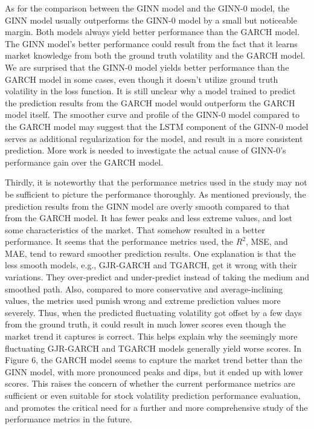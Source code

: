 As for the comparison between the GINN model and the GINN-0 model, the GINN model usually outperforms the GINN-0 model by a small but noticeable margin. Both models always yield better performance than the GARCH model. The GINN model's better performance could result from the fact that it learns market knowledge from both the ground truth volatility and the GARCH model. We are surprised that the GINN-0 model yields better performance than the GARCH model in some cases, even though it doesn't utilize ground truth volatility in the loss function. It is still unclear why a model trained to predict the prediction results from the GARCH model would outperform the GARCH model itself. The smoother curve and profile of the GINN-0 model compared to the GARCH model may suggest that the LSTM component of the GINN-0 model serves as additional regularization for the model, and result in a more consistent prediction. More work is needed to investigate the actual cause of GINN-0's performance gain over the GARCH model. 

Thirdly, it is noteworthy that the performance metrics used in the study may not be sufficient to picture the performance thoroughly. As mentioned previously, the prediction results from the GINN model are overly smooth compared to that from the GARCH model. It has fewer peaks and less extreme values, and lost some characteristics of the market. That somehow resulted in a better performance. It seems that the performance metrics used, the $R^2$, MSE, and MAE, tend to reward smoother prediction results. One explanation is that the less smooth models, e.g., GJR-GARCH and TGARCH, get it wrong with their variations. They over-predict and under-predict instead of taking the medium and smoothed path. Also, compared to more conservative and average-inclining values, the metrics used punish wrong and extreme prediction values more severely. Thus, when the predicted fluctuating volatility got offset by a few days from the ground truth, it could result in much lower scores even though the market trend it captures is correct. This helps explain why the seemingly more fluctuating GJR-GARCH and TGARCH models generally yield worse scores. In Figure 6, the GARCH model seems to capture the market trend better than the GINN model, with more pronounced peaks and dips, but it ended up with lower scores. This raises the concern of whether the current performance metrics are sufficient or even suitable for stock volatility prediction performance evaluation, and promotes the critical need for a further and more comprehensive study of the performance metrics in the future. 


